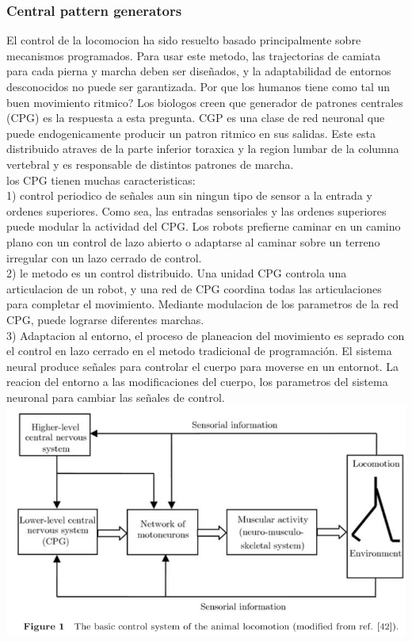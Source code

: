 \documentclass[10pt,onecolumn,twoside,letterpaper]{article}
\begin{document}
\subsubsection{Central pattern generators}
El control de la locomocion ha sido resuelto basado principalmente sobre mecanismos programados. Para usar este metodo, las trajectorias de camiata para cada pierna y marcha deben ser dise\~nados, y la adaptabilidad de entornos desconocidos no puede ser garantizada. Por que los humanos tiene como tal un buen movimiento ritmico? Los biologos creen que generador de patrones centrales (CPG) es la respuesta a esta pregunta. CGP es una clase de red neuronal que puede endogenicamente producir un patron ritmico en sus salidas. Este esta distribuido atraves de la parte inferior toraxica y la region lumbar de la columna vertebral y es responsable de distintos patrones de marcha.\cite{Wu2009}\\
los CPG tienen muchas caracteristicas:\cite{Wu2009}\\
1) control periodico de se\~nales aun sin ningun tipo de sensor a la entrada y ordenes  superiores. Como sea, las entradas sensoriales y las ordenes superiores puede modular la actividad del CPG. Los robots prefierne caminar en un camino plano con un control de lazo abierto o adaptarse al caminar sobre un terreno irregular con un lazo cerrado de control.\\
2) le metodo es un control distribuido. Una unidad CPG controla una articulacion de un robot, y una red de CPG coordina todas las articulaciones para completar el movimiento. Mediante modulacion de los parametros de la red CPG, puede lograrse diferentes marchas.\\
3) Adaptacion al entorno, el proceso de planeacion del movimiento es seprado con el control en lazo cerrado en el metodo tradicional de programaci\'on. El sistema neural produce se\~nales para controlar el cuerpo para moverse en un entornot. La reacion del entorno a las modificaciones del cuerpo, los parametros del sistema neuronal para cambiar las se\~nales de control.\\
\includegraphics[scale=0.4]{../../images/CPGBasicControlSystem.png}\cite{Wu2009}\\
\end{document}
